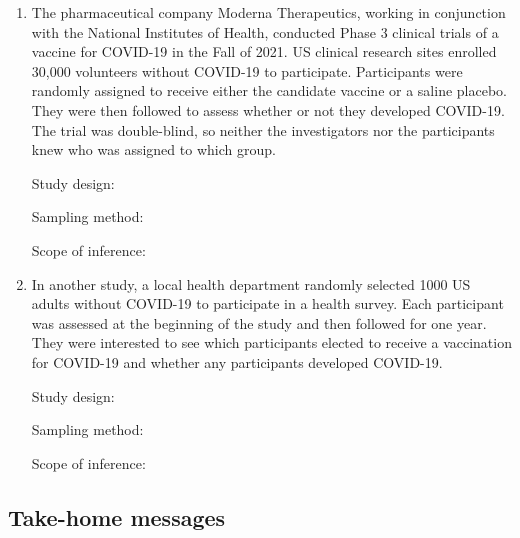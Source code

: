 \documentclass[
]{report}
\begin{document}
\begin{enumerate}
\def\labelenumi{\arabic{enumi}.}
\setcounter{enumi}{14}
\item
  The pharmaceutical company Moderna Therapeutics, working in conjunction with the National Institutes of Health, conducted Phase 3 clinical trials of a vaccine for COVID-19 in the Fall of 2021. US clinical research sites enrolled 30,000 volunteers without COVID-19 to participate. Participants were randomly assigned to receive either the candidate vaccine or a saline placebo. They were then followed to assess whether or not they developed COVID-19. The trial was double-blind, so neither the investigators nor the participants knew who was assigned to which group.
  \vspace{0.1in}

  Study design:
  \vspace{0.3in}

  Sampling method:
  \vspace{0.3in}

  Scope of inference:
  \newpage
\item
  In another study, a local health department randomly selected 1000 US adults without COVID-19 to participate in a health survey. Each participant was assessed at the beginning of the study and then followed for one year. They were interested to see which participants elected to receive a vaccination for COVID-19 and whether any participants developed COVID-19.
  \vspace{0.1in}

  Study design:
  \vspace{0.3in}

  Sampling method:
  \vspace{0.3in}

  Scope of inference:
  \vspace{0.3in}
\end{enumerate}

\subsection{Take-home messages}\label{take-home-messages}
\end{document}
